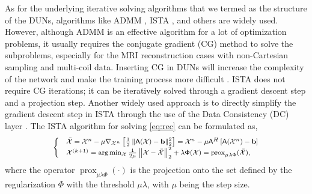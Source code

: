 As for the underlying iterative solving algorithms that we termed as the structure of the DUNs, algorithms like ADMM \cite{boyd2011distributed}, ISTA \cite{beck2009fast}, and others are widely used. However, although ADMM is an effective algorithm for a lot of optimization problems, it usually requires the conjugate gradient (CG) method to solve the subproblems, especially for the MRI reconstruction cases with non-Cartesian sampling and multi-coil data. Inserting CG in DUNs will increase the complexity of the network and make the training process more difficult \cite{aggarwal2018modl}. ISTA does not require CG iterations; it can be iteratively solved through a gradient descent step and a projection step. Another widely used approach is to directly simplify the gradient descent step in ISTA through the use of the Data Consistency (DC) layer \cite{ref_DCCNN,sriram2020end}. %
The ISTA algorithm for solving \eqref{eq:rec} can be formulated as,
\begin{equation}
	\footnotesize
	\label{eq:ista}
	\begin{cases}
		&\bar{\mathcal{X}} = \mathcal{X}^{n} - \mu \nabla_{\mathcal{X}^{n}} \left[ \frac{1}{2} \left\| \mathsf{A} (\mathcal{X}) - \mathbf{b} \right\|_2^2 \right] = \mathcal{X}^{n} - \mu \mathsf{A}^H\left[\mathsf{A}(\mathcal{X}^{n})-\mathbf{b}\right] \\
		&\mathcal{X}^{(k+1)} = \arg\min_{\mathcal{X}} \frac{1}{2\mu} \left\| \mathcal{X} - \bar{\mathcal{X}} \right\|_2^2 + \lambda \mathsf{\Phi}(\mathcal{X})=\operatorname{prox}_{\mu\lambda \mathsf{\Phi}}(\bar{\mathcal{X}}),
	\end{cases}
\end{equation}
where the operator $\operatorname{prox}_{\mu\lambda \mathsf{\Phi}}(\cdot)$ is the projection onto the set defined by the regularization $\Phi$ with the threshold $\mu\lambda$, with $\mu$ being the step size.

